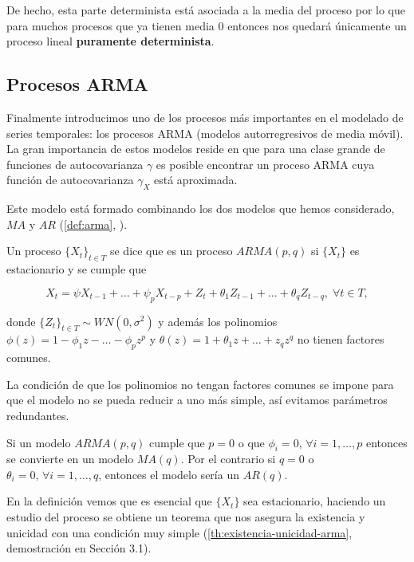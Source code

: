 De hecho, esta parte determinista está asociada a la media del proceso por lo que para muchos procesos que ya tienen media 0 entonces nos quedará únicamente un proceso lineal \textbf{puramente determinista}.

\subsection{Procesos ARMA}

Finalmente introducimos uno de los procesos más importantes en el modelado de series temporales: los procesos ARMA (modelos autorregresivos de media móvil). La gran importancia de estos modelos reside en que para una clase grande de funciones de autocovarianza $\gamma$ es posible encontrar un proceso ARMA cuya función de autocovarianza $\gamma_X$ está aproximada.

Este modelo está formado combinando los dos modelos que hemos considerado, $MA$ y $AR$ (\autoref{def:arma}, \cite{whittle1951arma}).

\begin{definicion}
  Un proceso $\{X_t\}_{t \in T}$ se dice que es un proceso $ARMA(p, q)$ si $\{X_t\}$ es estacionario y se cumple que

  $$X_t = \psi X_{t-1} + \ldots + \psi_p X_{t-p} + Z_t + \theta_1 Z_{t-1} + \ldots + \theta_q Z_{t - q}, \; \forall t \in T,$$

  donde $\{Z_t\}_{t \in T} \sim WN(0, \sigma^2)$ y además los polinomios $\phi(z) = 1 - \phi_1 z - \ldots - \phi_p z^p$ y $\theta(z) = 1 + \theta_1z + \ldots + z_q z^q$ no tienen factores comunes.
\label{def:arma}
\end{definicion}

La condición de que los polinomios no tengan factores comunes se impone para que el modelo no se pueda reducir a uno más simple, así evitamos parámetros redundantes.

Si un modelo $ARMA(p, q)$ cumple que $p = 0$ o que $\phi_i = 0, \, \forall i = 1, \ldots, p$ entonces se convierte en un modelo $MA(q)$. Por el contrario si $q = 0$ o $\theta_i = 0, \, \forall i = 1, \ldots, q$, entonces el modelo sería un $AR(q)$.

En la definición vemos que es esencial que $\{X_t\}$ sea estacionario, haciendo un estudio del proceso se obtiene un teorema que nos asegura la existencia y unicidad con una condición muy simple (\autoref{th:existencia-unicidad-arma}, demostración en \cite{brockwell2002introduction} Sección 3.1).


